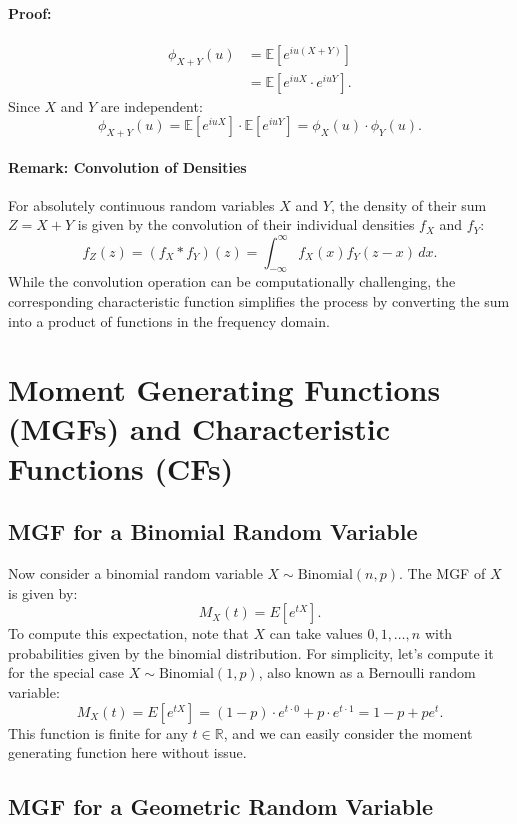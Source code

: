     \paragraph{Proof:}
    \begin{align*}
    \phi_{X+Y}(u) &= \mathbb{E}\left[e^{i u (X + Y)}\right] \\
    &= \mathbb{E}\left[e^{i u X} \cdot e^{i u Y}\right].
    \end{align*}
    Since \( X \) and \( Y \) are independent:
    \[
    \phi_{X+Y}(u) = \mathbb{E}\left[e^{i u X}\right] \cdot \mathbb{E}\left[e^{i u Y}\right] = \phi_X(u) \cdot \phi_Y(u).
    \]
    
    \paragraph{Remark: Convolution of Densities}
    For absolutely continuous random variables \( X \) and \( Y \), the density of their sum \( Z = X + Y \) is given by the convolution of their individual densities \( f_X \) and \( f_Y \):
    \[
    f_Z(z) = (f_X * f_Y)(z) = \int_{-\infty}^\infty f_X(x) f_Y(z - x) \, dx.
    \]
    While the convolution operation can be computationally challenging, the corresponding characteristic function simplifies the process by converting the sum into a product of functions in the frequency domain.
\section{Moment Generating Functions (MGFs) and Characteristic Functions (CFs)}
    \subsection{MGF for a Binomial Random Variable}
    Now consider a binomial random variable \( X \sim \text{Binomial}(n, p) \). The MGF of \( X \) is given by:
    \[
    M_X(t) = E[e^{tX}].
    \]
    To compute this expectation, note that \( X \) can take values \( 0, 1, \ldots, n \) with probabilities given by the binomial distribution. For simplicity, let’s compute it for the special case \( X \sim \text{Binomial}(1, p) \), also known as a Bernoulli random variable:
    \[
    M_X(t) = E[e^{tX}] = (1 - p) \cdot e^{t \cdot 0} + p \cdot e^{t \cdot 1} = 1 - p + p e^t.
    \]
    This function is finite for any \( t \in \mathbb{R} \), and we can easily consider the moment generating function here without issue.
    
    \subsection{MGF for a Geometric Random Variable}
    
